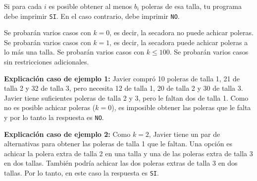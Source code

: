 \documentclass{oci}
\begin{document}
\begin{outputDescription}
Si para cada $i$ es posible obtener al menos $b_i$ poleras de esa talla, tu programa debe imprimir
\texttt{SI}.
En el caso contrario, debe imprimir \texttt{NO}.
\end{outputDescription}

\begin{scoreDescription}
  Se probarán varios casos con $k=0$, es decir, la secadora no puede achicar poleras.
  Se probarán varios casos con $k=1$, es decir, la secadora puede achicar poleras a lo más una talla.
  Se probarán varios casos con $k \leq 100$.
  Se probarán varios casos sin restricciones adicionales.
\end{scoreDescription}

\begin{sampleDescription}
\begin{center}
    \begin{minipage}{0.94\textwidth}
    \textbf{Explicación caso de ejemplo 1:} Javier compró 10 poleras de talla 1, 21 de talla 2 y 32 de talla 3,
    pero necesita 12 de talla 1, 20 de talla 2 y 30 de talla 3.
    Javier tiene suficientes poleras de talla 2 y 3, pero le faltan dos de talla 1.
    Como no es posible achicar poleras ($k=0$), es imposible obtener las poleras que le falta y por
    lo tanto la respuesta es \texttt{NO}.
    \end{minipage}
\end{center}

\begin{center}
    \begin{minipage}{0.94\textwidth}
    \textbf{Explicación caso de ejemplo 2:} Como $k=2$, Javier tiene un par de alternativas para obtener
    las poleras de talla 1 que le faltan.
    Una opción es achicar la polera extra de talla 2 en una talla y una de las poleras extra de
    talla 3 en dos tallas.
    También podría achicar las dos poleras extras de talla 3 en dos tallas.
    Por lo tanto, en este caso la respuesta es \texttt{SI}.
    \end{minipage}
\end{center}
\end{sampleDescription}
\end{document}
